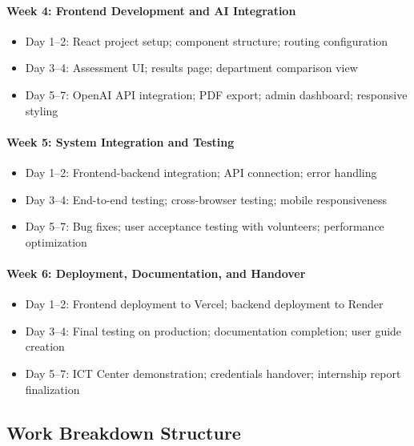 \documentclass[12pt, a4paper]{article}
\begin{document}
\begin{itemize}[leftmargin=1.5em, itemsep=3pt]
\paragraph{Week 4: Frontend Development and AI Integration}

\begin{itemize}[leftmargin=1.5em, itemsep=2pt]
    \item Day 1--2: React project setup; component structure; routing configuration
    \item Day 3--4: Assessment UI; results page; department comparison view
    \item Day 5--7: OpenAI API integration; PDF export; admin dashboard; responsive styling
\end{itemize}

\paragraph{Week 5: System Integration and Testing}

\begin{itemize}[leftmargin=1.5em, itemsep=2pt]
    \item Day 1--2: Frontend-backend integration; API connection; error handling
    \item Day 3--4: End-to-end testing; cross-browser testing; mobile responsiveness
    \item Day 5--7: Bug fixes; user acceptance testing with volunteers; performance optimization
\end{itemize}

\paragraph{Week 6: Deployment, Documentation, and Handover}

\begin{itemize}[leftmargin=1.5em, itemsep=2pt]
    \item Day 1--2: Frontend deployment to Vercel; backend deployment to Render
    \item Day 3--4: Final testing on production; documentation completion; user guide creation
    \item Day 5--7: ICT Center demonstration; credentials handover; internship report finalization
\end{itemize}

\subsection{Work Breakdown Structure}


\end{itemize}
\end{document}
